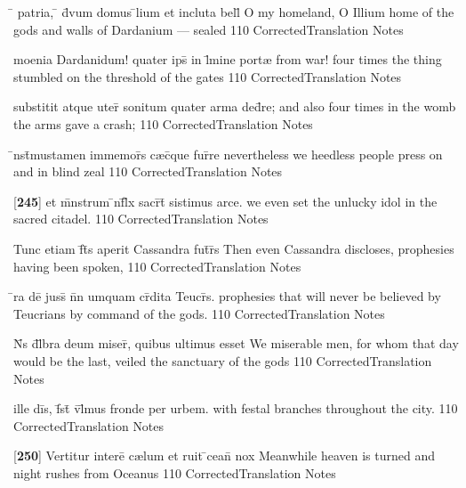 \latline
  {\={} patria, \={} d\={\macron {\i}}vum domus \={}lium et incluta bell\={}}
  { O my homeland, O Illium home of the gods and walls of Dardanium  --- sealed}
  {110}
  { CorrectedTranslation }
  { Notes }


\latline
  {moenia Dardanidum! quater ips\={} in l\={\macron {\i}}mine port{\ae}}
  { from war!  four times the thing stumbled on the threshold of the gates }
  {110}
  { CorrectedTranslation }
  { Notes }


\latline
  {substitit atque uter\={} sonitum quater arma ded\={}re;}
  { and also four times in the womb the arms gave a crash; }
  {110}
  { CorrectedTranslation }
  { Notes }


\latline
  {\={\macron {\i}}nst\={}mustamen immemor\={}s c{\ae}c\={\macron {\i}}que fur\={}re}
  { nevertheless we heedless people press on and in blind zeal }
  {110}
  { CorrectedTranslation }
  { Notes }


\latline
  {[\textbf{245}] et m\={}nstrum \={\macron {\i}}nf\={}l\={\macron {\i}}x sacr\={}t\={} sistimus arce.}
  { we even set the unlucky idol in the sacred citadel. }
  {110}
  { CorrectedTranslation }
  { Notes }


\latline
  {Tunc etiam f\={}t\={\macron {\i}}s aperit Cassandra fut\={}r\={\macron {\i}}s}
  { Then even Cassandra discloses, prophesies having been spoken, }
  {110}
  { CorrectedTranslation }
  { Notes }


\latline
  {\={}ra de\={\macron {\i}}  juss\={} n\={}n umquam cr\={}dita Teucr\={\macron {\i}}s.}
  { prophesies that will never be believed by Teucrians by command of the gods.  }
  {110}
  { CorrectedTranslation }
  { Notes }


\latline
  {N\={}s d\={}l\={}bra deum miser\={\macron {\i}}, quibus ultimus esset}
  { We miserable men, for whom that day would be the last, veiled the sanctuary of the gods }
  {110}
  { CorrectedTranslation }
  { Notes }


\latline
  {ille di\={}s, f\={}st\={} v\={}l\={}mus fronde per urbem.}
  { with festal branches throughout the city. }
  {110}
  { CorrectedTranslation }
  { Notes }


\latline
  {[\textbf{250}] Vertitur intere\={} c{\ae}lum et ruit \={}cean\={} nox}
  { Meanwhile heaven is turned and night rushes from Oceanus }
  {110}
  { CorrectedTranslation }
  { Notes }


